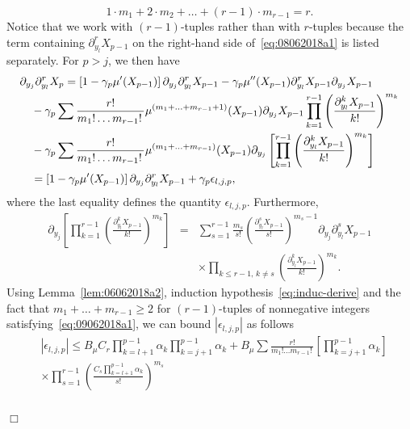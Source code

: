 \documentclass[bj]{imsart}
\newcommand{\proofendsign}{$\Box$}
\newenvironment{proof}{{\noindent \bf Proof }}
 {{\hspace*{\fill}\proofendsign\par\bigskip}}
\begin{document}
\begin{proof}
\begin{equation}
1\cdot m_{1}+2\cdot m_{2}+\ldots+(r-1)\cdot m_{r-1}=r.
\end{equation}
Notice that we work with $(r-1)$-tuples
rather than with $r$-tuples
because the term containing
$\partial_{y_l}^r X_{p-1}$
on the right-hand side of~\eqref{eq:08062018a1}
is listed separately.
For $p>j$, we then have
\begin{align}
&\partial_{y_{j}}\partial_{y_{l}}^{r}X_{p}
=\left[1-\gamma_{p}\mu'(X_{p-1})\right]\partial_{y_{j}}\partial_{y_{l}}^{r}X_{p-1}-\gamma_{p}\mu''(X_{p-1})\partial_{y_{l}}^{r}X_{p-1}\partial_{y_{j}}X_{p-1}
\label{eq:09062018a2}\\
&\hspace{1em}-\gamma_{p}\sum\frac{r!}{m_{1}!\ldots m_{r-1}!\,}\mu^{(m_{1}+\ldots+m_{r-1}+1)}(X_{p-1})\partial_{y_{j}}X_{p-1}\prod_{k=1}^{r-1}\left(\frac{\partial_{y_{l}}^{k}X_{p-1}}{k!}\right)^{m_{k}}
\notag\\
&\hspace{1em}-\gamma_{p}\sum\frac{r!}{m_{1}!\ldots m_{r-1}!\,}\mu^{(m_{1}+\ldots+m_{r-1})}(X_{p-1})\partial_{y_{j}}\left[\prod_{k=1}^{r-1}\left(\frac{\partial_{y_{l}}^{k}X_{p-1}}{k!}\right)^{m_{k}}\right]
\notag\\
&\hspace{1em} =\left[1-\gamma_{p}\mu'(X_{p-1})\right]\partial_{y_{j}}\partial_{y_{l}}^{r}X_{p-1}+\gamma_{p}\epsilon_{l,j,p},
\notag
\end{align}
where the last equality defines the quantity $\epsilon_{l,j,p}$.
Furthermore,
\begin{eqnarray*}
\partial_{y_{j}}\left[\prod_{k=1}^{r-1}\left(\frac{\partial_{y_{l}}^{k}X_{p-1}}{k!}\right)^{m_{k}}\right]&=&\sum_{s=1}^{r-1}\frac{m_{s}}{s!}\left(\frac{\partial_{y_{l}}^{s}X_{p-1}}{s!}\right)^{m_{s}-1}\partial_{y_{j}}\partial_{y_{l}}^{s}X_{p-1}
\\
&& \times \prod_{k\le r-1,\,k\neq s}\left(\frac{\partial_{y_{l}}^{k}X_{p-1}}{k!}\right)^{m_{k}}.
\end{eqnarray*}
Using Lemma~\ref{lem:06062018a2},
induction hypothesis~\eqref{eq:induc-derive}
and the fact that $m_{1}+\ldots+m_{r-1}\ge2$
for $(r-1)$-tuples of nonnegative integers
satisfying~\eqref{eq:09062018a1},
we can bound $|\epsilon_{l,j,p}|$ as follows
\begin{align*}
&\left|\epsilon_{l,j,p}\right|  \leq  B_{\mu}C_{r}\prod_{k=l+1}^{p-1}\alpha_{k}\prod_{k=j+1}^{p-1}\alpha_{k}+B_{\mu}\sum\frac{r!}{m_{1}!\ldots m_{r-1}!\,}\left[\prod_{k=j+1}^{p-1}\alpha_{k}\right]
\\
&\times \prod_{s=1}^{r-1}\left(\frac{C_{s}\prod_{k=l+1}^{p-1}\alpha_{k}}{s!}\right)^{m_{s}}\\

\end{align*}
\end{proof}
\end{document}
